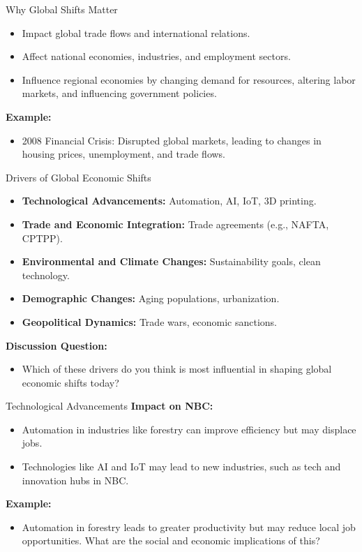 \documentclass{beamer}
\begin{document}
\begin{frame}{Why Global Shifts Matter}
    \begin{itemize}
        \item Impact global trade flows and international relations.
        \item Affect national economies, industries, and employment sectors.
        \item Influence regional economies by changing demand for resources, altering labor markets, and influencing government policies.
    \end{itemize}
    \textbf{Example:}
    \begin{itemize}
        \item 2008 Financial Crisis: Disrupted global markets, leading to changes in housing prices, unemployment, and trade flows.
    \end{itemize}
\end{frame}

\begin{frame}{Drivers of Global Economic Shifts}
    \begin{itemize}
        \item \textbf{Technological Advancements:} Automation, AI, IoT, 3D printing.
        \item \textbf{Trade and Economic Integration:} Trade agreements (e.g., NAFTA, CPTPP).
        \item \textbf{Environmental and Climate Changes:} Sustainability goals, clean technology.
        \item \textbf{Demographic Changes:} Aging populations, urbanization.
        \item \textbf{Geopolitical Dynamics:} Trade wars, economic sanctions.
    \end{itemize}
    \textbf{Discussion Question:}
    \begin{itemize}
        \item Which of these drivers do you think is most influential in shaping global economic shifts today?
    \end{itemize}
\end{frame}

\begin{frame}{Technological Advancements}
    \textbf{Impact on NBC:}
    \begin{itemize}
        \item Automation in industries like forestry can improve efficiency but may displace jobs.
        \item Technologies like AI and IoT may lead to new industries, such as tech and innovation hubs in NBC.
    \end{itemize}
    \textbf{Example:}
    \begin{itemize}
        \item Automation in forestry leads to greater productivity but may reduce local job opportunities. What are the social and economic implications of this?
    \end{itemize}
\end{frame}
\end{document}
